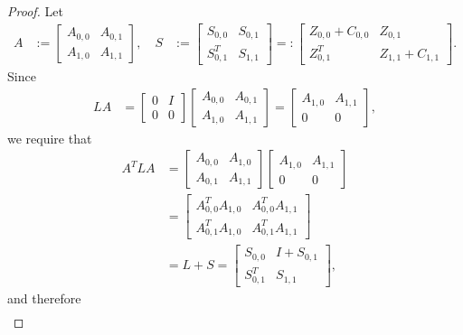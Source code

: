\documentclass[12pt,a4paper]{article}
\begin{document}
\begin{proof}
Let
\begin{align*}
A
&:=
\left[
\begin{array}{cc}
A_{0,0} & A_{0,1}
\\
A_{1,0} & A_{1,1}
\end{array}
\right],
\quad
S
&:=
\left[
\begin{array}{cc}
S_{0,0} & S_{0,1}
\\
S_{0,1}^T & S_{1,1}
\end{array}
\right]
=:
\left[
\begin{array}{cc}
Z_{0,0} + C_{0,0} & Z_{0,1}
\\
Z_{0,1}^T & Z_{1,1} + C_{1,1}
\end{array}
\right].
\end{align*}
Since
\begin{align*}
L A
&=
\left[
\begin{array}{cc}
0 & I
\\
0 & 0
\end{array}
\right]
\left[
\begin{array}{cc}
A_{0,0} & A_{0,1}
\\
A_{1,0} & A_{1,1}
\end{array}
\right]
=
\left[
\begin{array}{cc}
A_{1,0} & A_{1,1}
\\
0 & 0
\end{array}
\right],
\end{align*}
we require that
\begin{align*}
A^T L A
&=
\left[
\begin{array}{cc}
A_{0,0} & A_{1,0}
\\
A_{0,1} & A_{1,1}
\end{array}
\right]
\left[
\begin{array}{cc}
A_{1,0} & A_{1,1}
\\
0 & 0
\end{array}
\right]
\\
&=
\left[
\begin{array}{cc}
A_{0,0}^T A_{1,0} & A_{0,0}^T A_{1,1}
\\
A_{0,1}^T A_{1,0} & A_{0,1}^T A_{1,1}
\end{array}
\right]
\\
&=
L + S
=
\left[
\begin{array}{cc}
S_{0,0} & I + S_{0,1}
\\
S_{0,1}^T & S_{1,1}
\end{array}
\right],
\end{align*}
and therefore
\begin{align*}

\end{align*}
\end{proof}
\end{document}

